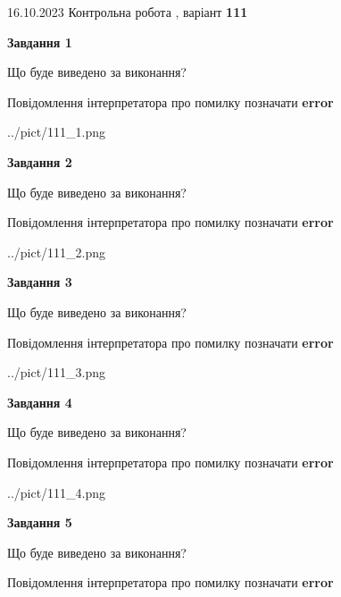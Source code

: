 \documentclass[12pt, ukrainian]{article}
\begin{document}
{\Large{16.10.2023 Контрольна робота , варіант  \No \textbf { 111 }\par}}
{
\begin {large}
{\begin {center}\textbf{Завдання 1}\end {center}}\par
Що буде виведено за виконання? \par
Повідомлення інтерпретатора про помилку позначати \textbf{error}

\begin{center}
	{../pict/111_1.png}
\end{center}
\newpage

{\begin {center}\textbf{Завдання 2}\end {center}}\par
Що буде виведено за виконання? \par
Повідомлення інтерпретатора про помилку позначати \textbf{error}

\begin{center}
	{../pict/111_2.png}
\end{center}
\newpage

{\begin {center}\textbf{Завдання 3}\end {center}}\par
Що буде виведено за виконання? \par
Повідомлення інтерпретатора про помилку позначати \textbf{error}

\begin{center}
	{../pict/111_3.png}
\end{center}
\newpage

{\begin {center}\textbf{Завдання 4}\end {center}}\par
Що буде виведено за виконання? \par
Повідомлення інтерпретатора про помилку позначати \textbf{error}

\begin{center}
	{../pict/111_4.png}
\end{center}
\newpage

{\begin {center}\textbf{Завдання 5}\end {center}}\par
Що буде виведено за виконання? \par
Повідомлення інтерпретатора про помилку позначати \textbf{error}


\end{large}}
\end{document}
